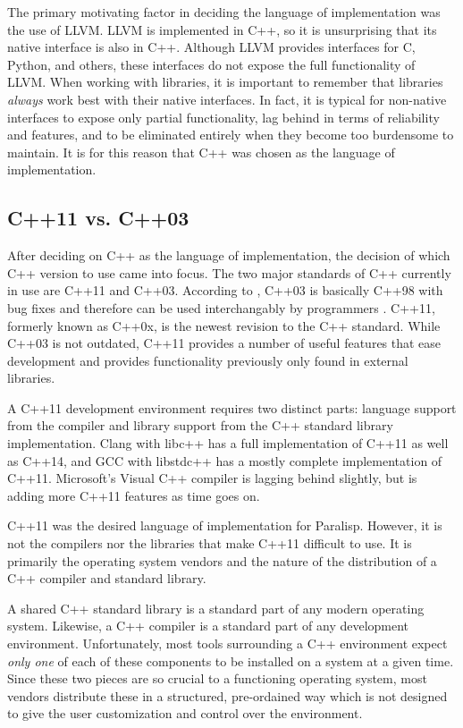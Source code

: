 \documentclass[abstracton]{scrartcl}
\begin{document}
The primary motivating factor in deciding the language of implementation was the use of LLVM\@. LLVM is implemented in C++, so it is unsurprising that its native interface is also in C++. Although LLVM provides interfaces for C, Python, and others, these interfaces do not expose the full functionality of LLVM\@. When working with libraries, it is important to remember that libraries \emph{always} work best with their native interfaces. In fact, it is typical for non-native interfaces to expose only partial functionality, lag behind in terms of reliability and features, and to be eliminated entirely when they become too burdensome to maintain. It is for this reason that C++ was chosen as the language of implementation.

\subsection{C++11 vs. C++03}

After deciding on C++ as the language of implementation, the decision of which C++ version to use came into focus. The two major standards of C++ currently in use are C++11 and C++03. According to \citeauthor{bs-faq}, C++03 is basically C++98 with bug fixes and therefore can be used interchangably by programmers \autocite{bs-faq}. C++11, formerly known as C++0x, is the newest revision to the C++ standard. While C++03 is not outdated, C++11 provides a number of useful features that ease development and provides functionality previously only found in external libraries.

A C++11 development environment requires two distinct parts: language support from the compiler and library support from the C++ standard library implementation. Clang with libc++ has a full implementation of C++11 as well as C++14, and GCC with libstdc++ has a mostly complete implementation of C++11. Microsoft's Visual C++ compiler is lagging behind slightly, but is adding more C++11 features as time goes on.

C++11 was the desired language of implementation for Paralisp. However, it is not the compilers nor the libraries that make C++11 difficult to use. It is primarily the operating system vendors and the nature of the distribution of a C++ compiler and standard library.

A shared C++ standard library is a standard part of any modern operating system. Likewise, a C++ compiler is a standard part of any development environment. Unfortunately, most tools surrounding a C++ environment expect \emph{only one} of each of these components to be installed on a system at a given time. Since these two pieces are so crucial to a functioning operating system, most vendors distribute these in a structured, pre-ordained way which is not designed to give the user customization and control over the environment.
\end{document}
